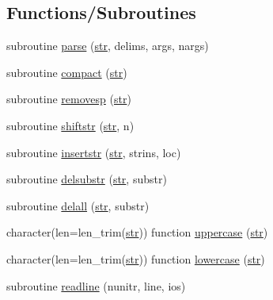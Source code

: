 \subsection*{Functions/\+Subroutines}
\begin{DoxyCompactItemize}
\item 
subroutine \hyperlink{namespacestrings_a6905131fa6e36e7e719b2f3c5f499d93}{parse} (\hyperlink{_s_o_l_w_e_i_g__misc_8f95_a77a2ca74046c88062aa8333bf1eaca05}{str}, delims, args, nargs)
\item 
subroutine \hyperlink{namespacestrings_a31b0ac7636006c8c80397649219c6eaf}{compact} (\hyperlink{_s_o_l_w_e_i_g__misc_8f95_a77a2ca74046c88062aa8333bf1eaca05}{str})
\item 
subroutine \hyperlink{namespacestrings_a15595b232883855ee75d1044d27694bd}{removesp} (\hyperlink{_s_o_l_w_e_i_g__misc_8f95_a77a2ca74046c88062aa8333bf1eaca05}{str})
\item 
subroutine \hyperlink{namespacestrings_a351d6a37fa1a55733a40b8c1b0dd686e}{shiftstr} (\hyperlink{_s_o_l_w_e_i_g__misc_8f95_a77a2ca74046c88062aa8333bf1eaca05}{str}, n)
\item 
subroutine \hyperlink{namespacestrings_a088c9da339db232b73bcb1f4da4fe5a2}{insertstr} (\hyperlink{_s_o_l_w_e_i_g__misc_8f95_a77a2ca74046c88062aa8333bf1eaca05}{str}, strins, loc)
\item 
subroutine \hyperlink{namespacestrings_ae1241e2ce69da61233e5dd7d98418d21}{delsubstr} (\hyperlink{_s_o_l_w_e_i_g__misc_8f95_a77a2ca74046c88062aa8333bf1eaca05}{str}, substr)
\item 
subroutine \hyperlink{namespacestrings_a453a1e27838f7417c0ea98cb36ebd9d7}{delall} (\hyperlink{_s_o_l_w_e_i_g__misc_8f95_a77a2ca74046c88062aa8333bf1eaca05}{str}, substr)
\item 
character(len=len\+\_\+trim(\hyperlink{_s_o_l_w_e_i_g__misc_8f95_a77a2ca74046c88062aa8333bf1eaca05}{str})) function \hyperlink{namespacestrings_a9e805cff1c9339d9c7e7d10808a97e62}{uppercase} (\hyperlink{_s_o_l_w_e_i_g__misc_8f95_a77a2ca74046c88062aa8333bf1eaca05}{str})
\item 
character(len=len\+\_\+trim(\hyperlink{_s_o_l_w_e_i_g__misc_8f95_a77a2ca74046c88062aa8333bf1eaca05}{str})) function \hyperlink{namespacestrings_ad5a1054d696063fbd4e11ad636796226}{lowercase} (\hyperlink{_s_o_l_w_e_i_g__misc_8f95_a77a2ca74046c88062aa8333bf1eaca05}{str})
\item 
subroutine \hyperlink{namespacestrings_a6c26fe0ca9e11a3ca296f1c350f54f42}{readline} (nunitr, line, ios)
\item 

\end{DoxyCompactItemize}
